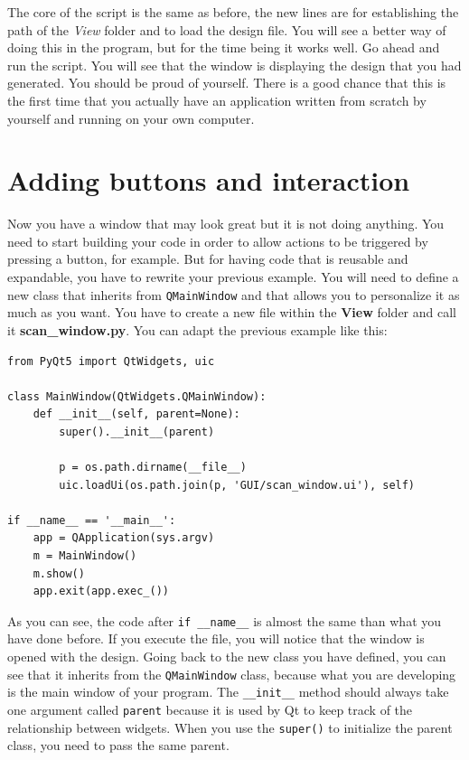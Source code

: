 The core of the script is the same as before, the new lines are for
establishing the path of the \emph{View} folder and to load the design
file. You will see a better way of doing this in the program, but for
the time being it works well. Go ahead and run the script. You will see
that the window is displaying the design that you had generated. You
should be proud of yourself. There is a good chance that this is the
first time that you actually have an application written from scratch by
yourself and running on your own computer.

\section{Adding buttons and interaction}\label{adding-buttons-andinteraction}
Now you have a window that may look great but it is not doing anything.
You need to start building your code in order to allow actions to be
triggered by pressing a button, for example. But for having code that
is reusable and expandable, you have to rewrite your previous example.
You will need to define a new class that inherits from
\texttt{QMainWindow} and that allows you to personalize it as much as
you want. You have to create a new file within the \textbf{View} folder
and call it \textbf{scan\_window.py}. You can adapt the previous example
like this:

\begin{verbatim}
from PyQt5 import QtWidgets, uic

class MainWindow(QtWidgets.QMainWindow):
    def __init__(self, parent=None):
        super().__init__(parent)

        p = os.path.dirname(__file__)
        uic.loadUi(os.path.join(p, 'GUI/scan_window.ui'), self)

if __name__ == '__main__':
    app = QApplication(sys.argv)
    m = MainWindow()
    m.show()
    app.exit(app.exec_())
\end{verbatim}

As you can see, the code after \texttt{if __name__} is almost the
same than what you have done before. If you execute the file, you will
notice that the window is opened with the design. Going back to the new
class you have defined, you can see that it inherits from the
\texttt{QMainWindow} class, because what you are developing is the main
window of your program. The \texttt{__init__} method should always
take one argument called \texttt{parent} because it is used by Qt to
keep track of the relationship between widgets. When you use the
\texttt{super()} to initialize the parent class, you need to pass the
same parent.

